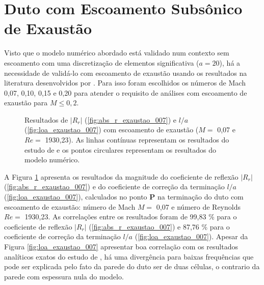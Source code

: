 



\newpage
\section{Duto com Escoamento Subsônico de Exaustão}

Visto que o modelo numérico abordado está validado num contexto sem escoamento com uma discretização de elementos significativa ($a = 20$), há a necessidade de validá-lo com escoamento de exaustão usando os resultados na literatura desenvolvidos por . Para isso foram escolhidos os números de Mach 0,07, 0,10, 0,15 e 0,20 para atender o requisito de  análises com escoamento de exaustão para $M \leq 0,2$.

\begin{figure}[ht!]
\begin{subfigure}{\scaleA \textwidth}
  
\end{subfigure}%
\begin{subfigure}{\scaleA \textwidth}
  
\end{subfigure}
\caption[Resultados de $|R_{r}|$ e $l/a$ com escoamento de exaustão ($M =$ 0,07 e $Re =$ 1930,23)]{Resultados de $|R_{r}|$ (\ref{fig:abs_r_exaustao_007}) e $l/a$ (\ref{fig:loa_exaustao_007}) com escoamento de exaustão ($M =$ 0,07 e $Re =$ 1930,23). As linhas contínuas representam os resultados do estudo de  e os pontos circulares representam os resultados do modelo numérico.}
\label{fig:resultados_exaustao_007}
\end{figure}

A Figura \ref{fig:resultados_exaustao_007} apresenta os resultados da magnitude do coeficiente de reflexão $|R_{r}|$ (\ref{fig:abs_r_exaustao_007}) e do coeficiente de correção da terminação $l/a$ (\ref{fig:loa_exaustao_007}), calculados no ponto $\textbf{P}$ na terminação do duto com escoamento de exaustão: número de Mach $M =$ 0,07 e número de Reynolds $Re =$ 1930,23.  As correlações entre os resultados foram de 99,83 \% para o coeficiente de reflexão $|R_{r}|$ (\ref{fig:abs_r_exaustao_007}) e 87,76 \% para o coeficiente de correção da terminação $l/a$ (\ref{fig:loa_exaustao_007}). Apesar da Figura \ref{fig:loa_exaustao_007} apresentar boa correlação com os resultados analíticos exatos do estudo de , há uma divergência para baixas frequências que pode ser explicada pelo fato da parede do duto ser de duas células, o contrario da parede com espessura nula do modelo.

